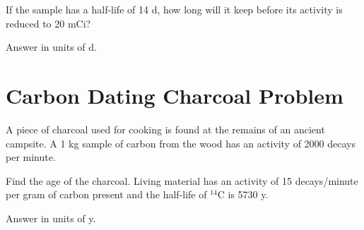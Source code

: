 \documentclass[../physics12.tex]{subfiles}
\begin{document}
If the sample has a half-life of 14 d, how long will it keep before its activity is reduced to 20 mCi?

Answer in units of d.

\section{Carbon Dating Charcoal Problem}
A piece of charcoal used for cooking is found at the remains of an ancient campsite. A 1 kg sample of carbon from the wood 
has an activity of 2000 decays per minute.

Find the age of the charcoal. Living material has an activity of 15 decays/minute per gram of carbon present and the half-life of $^{14}$C is 5730 y.

Answer in units of y.
\end{document}
